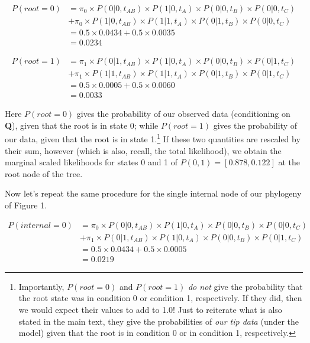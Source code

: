 \documentclass{article}
\begin{document}
\[\begin{aligned}
P(root=0) & = \pi_{0} \times P(0|0,t_{AB}) \times P(1|0,t_{A}) \times P(0|0,t_{B}) \times P(0|0,t_{C})\\ 
            & + \pi_{0} \times P(1|0,t_{AB}) \times P(1|1,t_{A}) \times P(0|1,t_{B}) \times P(0|0,t_{C})\\
            & = 0.5 \times 0.0434 + 0.5 \times 0.0035\\
            & = 0.0234
\end{aligned}\]

\[\begin{aligned}
P(root=1) & = \pi_{1} \times P(0|1,t_{AB}) \times P(1|0,t_{A}) \times P(0|0,t_{B}) \times P(0|1,t_{C})\\
            & + \pi_{1} \times P(1|1,t_{AB}) \times P(1|1,t_{A}) \times P(0|1,t_{B}) \times P(0|1,t_{C})\\
            & = 0.5 \times 0.0005 + 0.5 \times 0.0060 \\
            & = 0.0033
\end{aligned}\]

Here \(P(root = 0)\) gives the probability of our observed data (conditioning on \textbf{Q}), given that the root is in state 0; while \(P(root = 1)\) gives the probability of our data, given that the root is in state 1.\footnote{Importantly, $P(root = 0)$ and $P(root = 1)$ \emph{do not} give the probability that the root state was in condition 0 or condition 1, respectively. If they did, then we would expect their values to add to 1.0! Just to reiterate what is also stated in the main text, they give the probabilities of \emph{our tip data} (under the model) given that the root is in condition 0 or in condition 1, respectively.} If these two quantities are rescaled by their sum, however (which is also, recall, the total likelihood), we obtain the marginal scaled likelihoods for states 0 and 1 of \(P(0,1) = [0.878, 0.122]\) at the root node of the tree.

Now let's repeat the same procedure for the single internal node of our phylogeny of Figure 1.

\[\begin{aligned}
P(internal=0) & = \pi_{0} \times P(0|0,t_{AB}) \times P(1|0,t_{A}) \times P(0|0,t_{B}) \times P(0|0,t_{C})\\ 
            & + \pi_{1} \times P(0|1,t_{AB}) \times P(1|0,t_{A}) \times P(0|0,t_{B}) \times P(0|1,t_{C})\\
            & = 0.5 \times 0.0434 + 0.5 \times 0.0005 \\
            & = 0.0219
\end{aligned}\]
\end{document}
